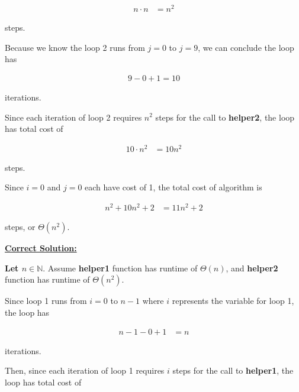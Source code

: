 \documentclass[12pt]{article}
\begin{document}
\begin{enumerate}[a.]
    \begin{align}
        n \cdot n &= n^2
    \end{align}

    steps.

    \bigskip

    Because we know the loop 2 runs from $j = 0$ to $j = 9$, we can conclude
    the loop has

    \begin{align}
        9 - 0 + 1 = 10
    \end{align}

    iterations.

    \bigskip

    Since each iteration of loop 2 requires $n^2$ steps for the call to
    \textbf{helper2}, the loop has total cost of

    \begin{align}
        10 \cdot n^2 &= 10n^2
    \end{align}

    steps.

    \bigskip

    Since $i = 0$ and $j = 0$ each have cost of 1, the total cost of algorithm
    is

    \begin{align}
        n^2 + 10n^2 + 2 &= 11n^2 + 2
    \end{align}

    steps, or $\Theta(n^2)$.

    \begin{mdframed}
        \underline{\textbf{Correct Solution:}}

        \bigskip

        \color{red}\textbf{Let $n \in \mathbb{N}$}\color{black}. Assume \textbf{helper1}
        function has runtime of $\Theta(n)$, and \textbf{helper2} function has runtime
        of $\Theta(n^2)$.

        \bigskip

        Since loop 1 runs from $i = 0$ to $n-1$ \color{red}where $i$ represents
        the variable for loop 1\color{black}, the loop has

        \setcounter{equation}{0}
        \begin{align}
            n - 1 - 0 + 1 &= n
        \end{align}

        iterations.

        \bigskip

        Then, since each iteration of loop 1 requires \color{red}\textbf{$i$}\color{black}
        \:steps for the call to \textbf{helper1}, the loop has total cost of


\end{mdframed}
\end{enumerate}
\end{document}
